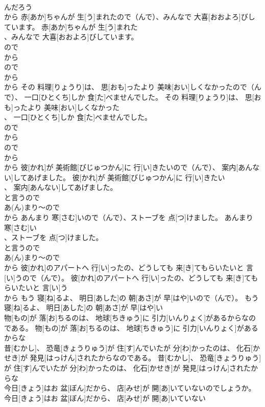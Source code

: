 \documentclass[8pt]{extreport}
\begin{document}
\begin{CJK}{UTF8}{min}
\\	んだろう
\\	から	赤[あか]ちゃんが 生[う]まれたので（んで）、みんなで 大喜[おおよろ]びしています。	赤[あか]ちゃんが 生[う]まれた
\\	、みんなで 大喜[おおよろ]びしています。	
\\	ので 
\\	から 
\\	ので 
\\	から 
\\	から	その 料理[りょうり]は、 思[おも]ったより 美味[おい]しくなかったので（んで）、 一口[ひとくち]しか 食[た]べませんでした。	その 料理[りょうり]は、 思[おも]ったより 美味[おい]しくなかった
\\	、 一口[ひとくち]しか 食[た]べませんでした。	
\\	ので 
\\	から 
\\	ので 
\\	から 
\\	から	彼[かれ]が 美術館[びじゅつかん]に 行[い]きたいので（んで）、 案内[あんない]してあげました。	彼[かれ]が 美術館[びじゅつかん]に 行[い]きたい
\\	、 案内[あんない]してあげました。	
\\	と言うので 
\\	あ(ん)まり～ので
\\	から	あんまり 寒[さむ]いので（んで）、ストーブを 点[つ]けました。	あんまり 寒[さむ]い
\\	、ストーブを 点[つ]けました。	
\\	と言うので 
\\	あ(ん)まり～ので
\\	から	彼[かれ]のアパートへ 行[い]ったの、どうしても 来[き]てもらいたいと 言[い]うので（んで）。	彼[かれ]のアパートへ 行[い]ったの、どうしても 来[き]てもらいたいと 言[い]う
\\	から	もう 寝[ね]るよ、 明日[あした]の 朝[あさ]が 早[はや]いので（んで）。	もう 寝[ね]るよ、 明日[あした]の 朝[あさ]が 早[はや]い
\\	物[もの]が 落[お]ちるのは、 地球[ちきゅう]に 引力[いんりょく]があるからなのである。	物[もの]が 落[お]ちるのは、 地球[ちきゅう]に 引力[いんりょく]があるからな
\\	昔[むかし]、 恐竜[きょうりゅう]が 住[す]んでいたが 分[わ]かったのは、 化石[かせき]が 発見[はっけん]されたからなのである。	昔[むかし]、 恐竜[きょうりゅう]が 住[す]んでいたが 分[わ]かったのは、 化石[かせき]が 発見[はっけん]されたからな
\\	今日[きょう]はお 盆[ぼん]だから、 店[みせ]が 開[あ]いていないのでしょうか。	今日[きょう]はお 盆[ぼん]だから、 店[みせ]が 開[あ]いていない

\end{CJK}
\end{document}
